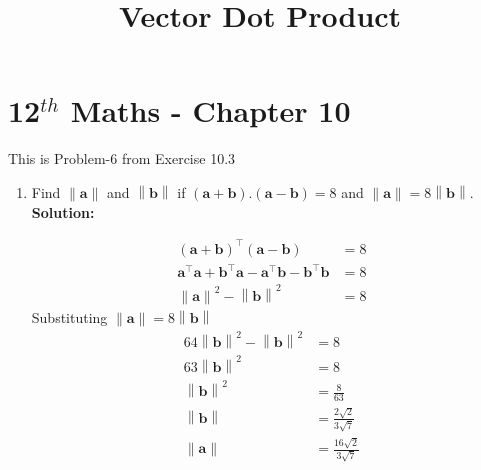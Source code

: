 \documentclass[12pt]{article}
\providecommand{\brak}[1]{\ensuremath{\left(#1\right)}}
\providecommand{\norm}[1]{\left\lVert#1\right\rVert}
\newcommand{\solution}{\noindent \textbf{Solution: }}
\let\vec\mathbf
\begin{document}
\begin{center}
\title{\textbf{Vector Dot Product}}
\date{\vspace{-5ex}} %
\maketitle
\end{center}
\setcounter{page}{1}

\section{12$^{th}$ Maths - Chapter 10}
This is Problem-6 from Exercise 10.3
\begin{enumerate}
\item Find $\norm{\vec{a}}$ and $\norm{\vec{b}}$ if 
$\brak{\vec{a}+\vec{b}}.\brak{\vec{a}-\vec{b}} = 8$ 
and $\norm{\vec{a}}=8\norm{\vec{b}}$.\\
\solution 

  \label{eq:det2f}
\begin{align}
  \brak{\vec{a}+\vec{b}}^\top\brak{\vec{a}-\vec{b}} &= 8\\
  \vec{a}^\top\vec{a} + \vec{b}^\top\vec{a} - \vec{a}^\top\vec{b} - \vec{b}^\top\vec{b} &= 8\\
  \norm{\vec{a}}^{2} - \norm{\vec{b}}^{2} &= 8
\end{align}
\text Substituting $\norm{\vec{a}}=8\norm{\vec{b}}$
\begin{align}
  64\norm{\vec{b}}^{2} - \norm{\vec{b}}^{2} &= 8 \\
  63\norm{\vec{b}}^{2} &= 8 \\
  \norm{\vec{b}}^{2} &= \frac{8}{63} \\
  \norm{\vec{b}} &= \frac{2\sqrt{2}}{3\sqrt{7}}\\
  \norm{\vec{a}} &= \frac{16\sqrt{2}}{3\sqrt{7}}
\end{align}
\end{enumerate}
\end{document}
